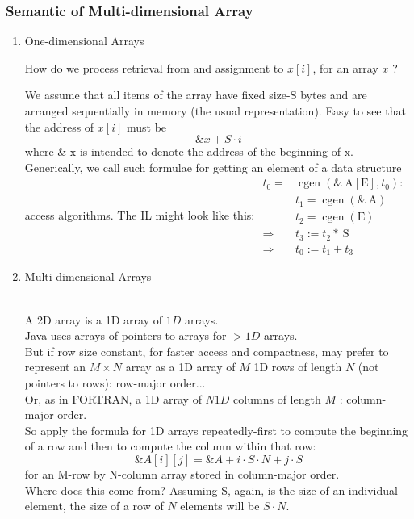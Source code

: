 \documentclass[a4paper]{exam}
\theoremstyle{definition}
\begin{document}
\subsubsection{Semantic of Multi-dimensional Array}
\begin{enumerate}
    \item One-dimensional Arrays
    
    How do we process retrieval from and assignment to $x[i]$, for an array $x$ ?
\begin{solution}
We assume that all items of the array have fixed size-S bytes and are arranged sequentially in memory (the usual representation).
Easy to see that the address of $x[i]$ must be
$$
\& x+S \cdot i
$$
where \& $\mathrm{x}$ is intended to denote the address of the beginning of $\mathrm{x}$. Generically, we call such formulae for getting an element of a data structure access algorithms.
The IL might look like this:
$\begin{aligned} t_{0}=& \operatorname{cgen}\left(\& \mathrm{~A}[\mathrm{E}], t_{0}\right): \\ & t_{1}=\operatorname{cgen}(\& \mathrm{~A}) \\ & t_{2}=\operatorname{cgen}(\mathrm{E}) \\ \Rightarrow & t_{3}:=t_{2} * \mathrm{~S} \\ \Rightarrow & t_{0}:=t_{1}+t_{3} \end{aligned}$
\end{solution}
\item Multi-dimensional  Arrays
\begin{enumerate}
    \\  A 2D array is a 1D array of $1 D$ arrays.
   \\ Java uses arrays of pointers to arrays for $>1 D$ arrays.
\\ But if row size constant, for faster access and compactness, may prefer to represent an $M \times N$ array as a 1D array of $M$ 1D rows of length $N$ (not pointers to rows): row-major order...
\\ Or, as in FORTRAN, a 1D array of $N 1 D$ columns of length $M$ : column-major order.
\\ So apply the formula for 1D arrays repeatedly-first to compute the beginning of a row and then to compute the column within that row:
$$
\& A[i][j]=\& A+i \cdot S \cdot N+j \cdot S
$$
for an M-row by N-column array stored in column-major order.
\\ Where does this come from? Assuming S, again, is the size of an individual element, the size of a row of $N$ elements will be $S \cdot N$.

\end{enumerate}
\end{enumerate}
\end{document}
